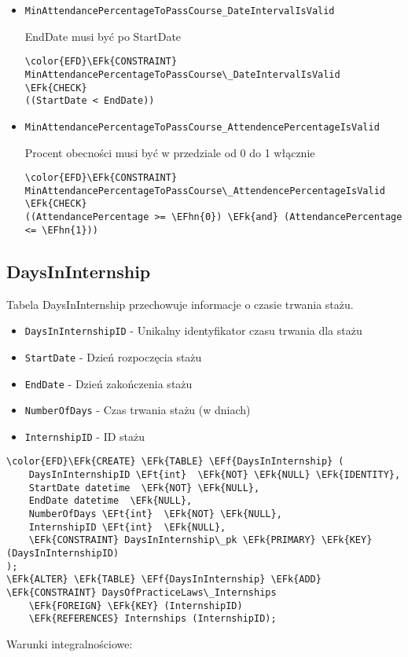 \documentclass[11pt]{article}
\newcommand{\EFk}[1]{\textcolor{EFk}{\textbf{#1}}} %
\newcommand{\EFf}[1]{\textcolor{EFf}{#1}} %
\newcommand{\EFt}[1]{\textcolor{EFt}{\textbf{#1}}} %
\newcommand{\EFhn}[1]{\textcolor{EFhn}{#1}} %
\begin{document}
\begin{itemize}
\item \texttt{MinAttendancePercentageToPassCourse\_DateIntervalIsValid}

EndDate musi być po StartDate
\begin{Code}
\begin{Verbatim}
\color{EFD}\EFk{CONSTRAINT} MinAttendancePercentageToPassCourse\_DateIntervalIsValid \EFk{CHECK}
((StartDate < EndDate))
\end{Verbatim}
\end{Code}
\item \texttt{MinAttendancePercentageToPassCourse\_AttendencePercentageIsValid}

Procent obecności musi być w przedziale od 0 do 1 włącznie
\begin{Code}
\begin{Verbatim}
\color{EFD}\EFk{CONSTRAINT} MinAttendancePercentageToPassCourse\_AttendencePercentageIsValid \EFk{CHECK}
((AttendancePercentage >= \EFhn{0}) \EFk{and} (AttendancePercentage <= \EFhn{1}))
\end{Verbatim}
\end{Code}
\end{itemize}
\subsection{DaysInInternship}
\label{sec:org2aefac6}
Tabela DaysInInternship przechowuje informacje o czasie trwania stażu.
\begin{itemize}
\item \texttt{DaysInInternshipID} - Unikalny identyfikator czasu trwania dla stażu
\item \texttt{StartDate} - Dzień rozpoczęcia stażu
\item \texttt{EndDate} - Dzień zakończenia stażu
\item \texttt{NumberOfDays} - Czas trwania stażu (w dniach)
\item \texttt{InternshipID} - ID stażu
\end{itemize}
\begin{Code}
\begin{Verbatim}
\color{EFD}\EFk{CREATE} \EFk{TABLE} \EFf{DaysInInternship} (
    DaysInInternshipID \EFt{int}  \EFk{NOT} \EFk{NULL} \EFk{IDENTITY},
    StartDate datetime  \EFk{NOT} \EFk{NULL},
    EndDate datetime  \EFk{NULL},
    NumberOfDays \EFt{int}  \EFk{NOT} \EFk{NULL},
    InternshipID \EFt{int}  \EFk{NULL},
    \EFk{CONSTRAINT} DaysInInternship\_pk \EFk{PRIMARY} \EFk{KEY}  (DaysInInternshipID)
);
\EFk{ALTER} \EFk{TABLE} \EFf{DaysInInternship} \EFk{ADD} \EFk{CONSTRAINT} DaysOfPracticeLaws\_Internships
    \EFk{FOREIGN} \EFk{KEY} (InternshipID)
    \EFk{REFERENCES} Internships (InternshipID);
\end{Verbatim}
\end{Code}
Warunki integralnościowe:
\end{document}
